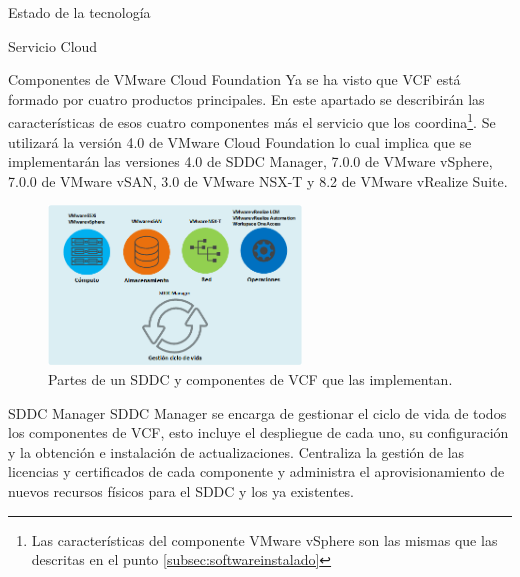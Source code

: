 \begin{chapter}{Estado de la tecnología}
\begin{section}{Servicio Cloud}
\begin{subsection}{Componentes de VMware Cloud Foundation}
    Ya se ha visto que VCF está formado por cuatro productos principales. En este apartado se describirán las características de esos cuatro componentes más el servicio que los coordina\footnote{Las características del componente VMware vSphere son las mismas que las descritas en el punto \ref{subsec:softwareinstalado}}. Se utilizará la versión 4.0 de VMware Cloud Foundation lo cual implica que se implementarán las versiones\cite{componentesCloudFound} 4.0 de SDDC Manager, 7.0.0 de VMware vSphere, 7.0.0 de VMware vSAN, 3.0 de VMware NSX-T y 8.2 de VMware vRealize Suite.
    \begin{figure}[h]
        \centering
            \includegraphics[width=0.6\textwidth]{imaxes/VCF-componentes/ComponentesVCF.png}
            \caption{Partes de un SDDC y componentes de VCF que las implementan.}
            \label{fig:componentes-funciones-VCF}
        \end{figure}
        \FloatBarrier
    \begin{subsubsection}{SDDC Manager}
        SDDC Manager se encarga de gestionar el ciclo de vida de todos los componentes de VCF, esto incluye el despliegue de cada uno, su configuración y la obtención e instalación de actualizaciones. Centraliza la gestión de las licencias y certificados de cada componente y administra el aprovisionamiento de nuevos recursos físicos para el SDDC y los ya existentes.
    \end{subsubsection}
    

\end{subsection}
\end{section}
\end{chapter}
